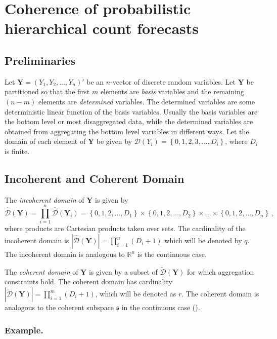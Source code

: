 \documentclass[a4paper,review,12pt,authoryear]{elsarticle}
\newcommand{\bY}{\mathbf{Y}}
\begin{document}
\section{Coherence of probabilistic hierarchical count forecasts}

\label{sec:coherence}

	
\subsection{Preliminaries}
Let $\bY=\left(Y_1,Y_2,\ldots,Y_n\right)'$ be an $n$-vector of discrete random variables.
Let $\bY$ be partitioned so that the first $m$ elements are \textit{basis} variables and the remaining $(n-m)$ elements are \textit{determined} variables.
The determined variables are some deterministic linear function of the basis variables. Usually the basis variables are the bottom level or most disaggregated data, while the determined variables are obtained from aggregating the bottom level variables in different ways. 
Let the domain of each element of $\bY$ be given by $\mathcal{D}(Y_i)=\left\{0, 1,2,3,\dots,D_i\right\}$, where $D_i$ is finite.

\subsection{Incoherent and Coherent Domain}
The \textit{incoherent domain} of $\bY$ is given by
\[
\hat{\mathcal D}(\bY)=\prod\limits_{i=1}^n\hat{\mathcal D}(\bY_i)=\left\{0, 1,2,\dots,D_1\right\}\times\left\{0,1,2,\dots,D_2\right\}\times\dots\times\left\{0,1,2,\dots,D_n\right\}\,,
\] 
where products are Cartesian products taken over sets. The cardinality of the incoherent domain is $|\hat{\mathcal D}(\bY)|=\prod\limits_{i=1}^{n} (D_i+1)$ which will be denoted by $q$. 
The incoherent domain is analogous to $\mathbb{R}^n$ is the continuous case.
  
The \textit{coherent domain} of $\bY$ is given by a subset of $\tilde{\mathcal D}(\bY)$ for which aggregation constraints hold.  
The coherent domain has cardinality $|\tilde{\mathcal D}(\bY)|=\prod\limits_{i=1}^{m} (D_i+1)$, which will be denoted as $r$. 
The coherent domain is analogous to the coherent subspace $\mathfrak{s}$ in the continuous case (\citealp{panagiotelisProbabilisticForecastReconciliation2022}).
  
  \subsubsection*{\textbf{Example}.}
  \label{sec:example}
  
\end{document}

